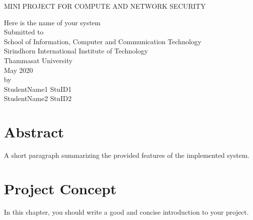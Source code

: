\documentclass[12pt, a4paper]{report}
\begin{document}
\begin{center}

\large 
\vspace*{2cm}

MINI PROJECT FOR COMPUTE AND NETWORK SECURITY\\[2cm]

\LARGE


Here is the name of your system\\[2cm]
\large
Submitted to \\[1cm]
School of Information, Computer and Communication Technology \\
Sirindhorn International Institute of Technology \\
Thammasat University \\[2cm]
May 2020 \\[3cm]
by \\[1cm]
StudentName1   StuID1 \\
StudentName2   StuID2\\[2cm]
\end{center}


\newpage
\pagestyle{plain}
\onehalfspace

\chapter*{Abstract} 

A short paragraph summarizing the provided features of the implemented system.

\tableofcontents


\listoffigures


\newpage
\thispagestyle{empty}
\setcounter{chapter}{0}
\setcounter{section}{0}
\def\thechapter{\arabic{chapter}}

%

\chapter{Project Concept}

In this chapter, you should write a good and concise introduction to your project. 
\end{document}
